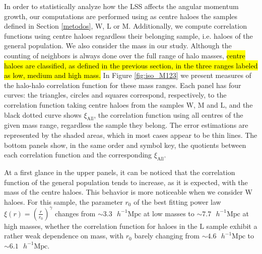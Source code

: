 \documentclass[fleqn,usenatbib]{mnras}
\newcommand{\hMpc}{{\textrm{ $h^{-1}$Mpc}}}
\newcommand{\hMsun}{{\textrm{ $h^{-1}$M$_{\sun}$}}}
\newcommand{\Wh}{\mathrm{W}}
\newcommand{\Lh}{\mathrm{L}}
\newcommand{\Mh}{\mathrm{M}}
\begin{document}
In order to statistically analyze how the LSS affects the angular momentum growth, our computations are performed using as centre haloes the samples defined in Section \ref{metodos}, $\Wh$, $\Lh$ or $\Mh$. Additionally, we compute correlation functions using centre haloes regardless their belonging sample, i.e. haloes of the {general population}. We also consider the mass in our study. 
Although the counting of neighbors is always done over the full range of halo masses, \hl{centre haloes are classified, as defined in the previous section, in the three ranges labeled as low, medium and high mass.}
In Figure \ref{fig:iso_M123} we present measures of the halo-halo correlation function for these mass ranges. Each panel has four curves: the triangles, circles and squares correspond, respectively, to the correlation function taking centre haloes from the samples $\Wh$, $\Mh$ and $\Lh$, and the black dotted curve shows $\xi_\mathrm{All}$, the correlation function using all centres of the given mass range, regardless the sample they belong. The error estimations are represented by the shaded areas, which in most cases appear to be thin lines. The bottom panels show, in the same order and symbol key, the quotients between each correlation function and the corresponding $\xi_\mathrm{All}$.

At a first glance in the upper panels, it can be noticed that the correlation function of the general population tends to increase, as it is expected, with the mass of the centre haloes. 
This behavior is more noticeable when we consider $\Wh$ haloes. For this sample, the parameter $r_0$ of the best fitting power law $\xi(r)=(\frac{r}{r_0})^{\gamma}$ changes from $\sim 3.3\hMpc$ at low masses to $\sim 7.7\hMpc$ at high masses, whether the correlation function for haloes in the $\Lh$ sample exhibit a rather weak dependence on mass, with $r_0$ barely changing from $\sim 4.6\hMpc$ to $\sim 6.1\hMpc$. 
\end{document}
